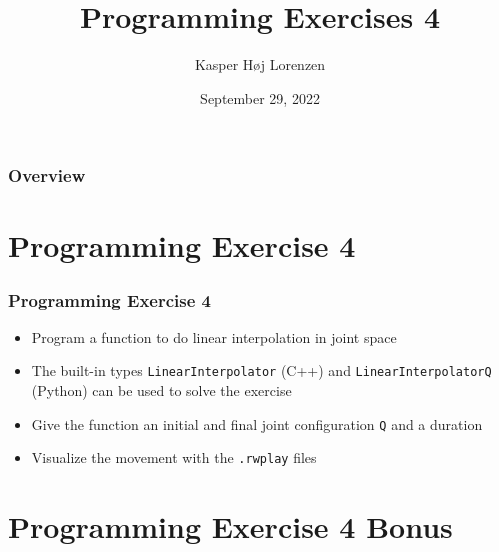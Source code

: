 \documentclass{beamer}
\title[Forward Kinematics]{Programming Exercises 4} %
\author{Kasper Høj Lorenzen} %
\institute[SDU Robotics] %
{
University of Southern Denmark \\ %
\medskip
\textit{kalor@mmmi.sdu.dk} %
}
\date{September 29, 2022} %
\begin{document}
\begin{frame}
\titlepage %
\end{frame}

\begin{frame}
\frametitle{Overview} %
\tableofcontents %
\end{frame}


\section{Programming Exercise 4} %


\begin{frame}
  \frametitle{Programming Exercise 4}
  \begin{itemize}
  \item Program a function to do linear interpolation in joint space
  \item The built-in types \texttt{LinearInterpolator} (C++) and \texttt{LinearInterpolatorQ} (Python) can be used to solve the exercise
  \item Give the function an initial and final joint configuration \texttt{Q} and a duration
  \item Visualize the movement with the \texttt{.rwplay} files
  \end{itemize}
\end{frame}

\section{Programming Exercise 4 Bonus} %
\end{document}
